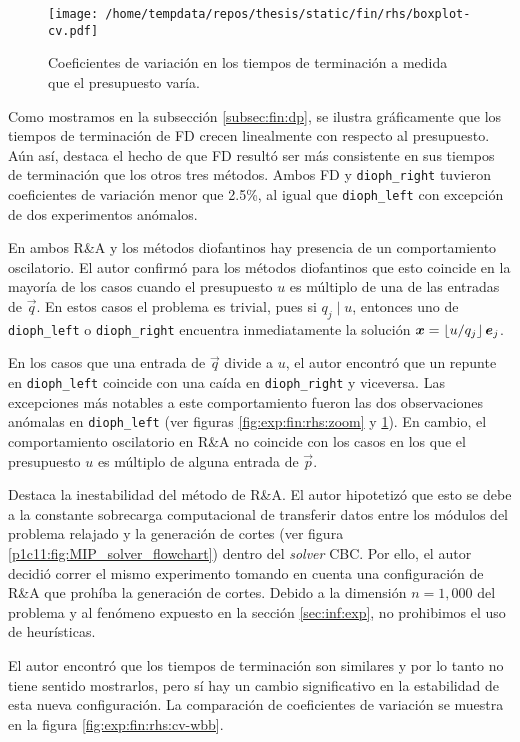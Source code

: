 \begin{figure}[hbtp]
	\centering
	\texttt{[image: /home/tempdata/repos/thesis/static/fin/rhs/boxplot-cv.pdf]}
	\caption{Coeficientes de variación en los tiempos de terminación a medida que el presupuesto
	varía.}
	\label{fig:exp:fin:rhs:cv}
\end{figure}

Como mostramos en la subsección \ref{subsec:fin:dp}, se ilustra gráficamente que los tiempos de
terminación de FD crecen linealmente con respecto al presupuesto. Aún así, destaca el hecho de que
FD resultó ser más consistente en sus tiempos de terminación que los otros tres métodos. Ambos FD y
\texttt{dioph\_right} tuvieron coeficientes de variación menor que 2.5\%, al igual que
\texttt{dioph\_left} con excepción de dos experimentos anómalos.

En ambos R\&A y los métodos diofantinos hay presencia de un comportamiento oscilatorio. El autor
confirmó para los métodos diofantinos que esto coincide en la mayoría de los casos cuando el
presupuesto $u$ es múltiplo de una de las entradas de $\vec{q}$. En estos casos el problema es
trivial, pues si $q_j \mid u$, entonces uno de \texttt{dioph\_left} o \texttt{dioph\_right}
encuentra inmediatamente la solución $\boldsymbol{x} = \left\lfloor u/q_j \right\rfloor\boldsymbol{e}_j$.

En los casos que una entrada de $\vec{q}$ divide a $u$, el autor encontró que un repunte en
\texttt{dioph\_left} coincide con una caída en \texttt{dioph\_right} y viceversa. Las excepciones
más notables a este comportamiento fueron las dos observaciones anómalas en \texttt{dioph\_left}
(ver figuras \ref{fig:exp:fin:rhs:zoom} y \ref{fig:exp:fin:rhs:cv}). En cambio, el comportamiento
oscilatorio en R\&A no coincide con los casos en los que el presupuesto $u$ es múltiplo de alguna
entrada de $\vec{p}$.

Destaca la inestabilidad del método de R\&A. El autor hipotetizó que esto se debe a la constante
sobrecarga computacional de transferir datos entre los módulos del problema relajado y la generación
de cortes (ver figura \ref{p1c11:fig:MIP_solver_flowchart}) dentro del \textit{solver} CBC. Por
ello, el autor decidió correr el mismo experimento tomando en cuenta una configuración de R\&A que
prohíba la generación de cortes. Debido a la dimensión $n = 1{,}000$ del problema y al fenómeno
expuesto en la sección \ref{sec:inf:exp}, no prohibimos el uso de heurísticas.

El autor encontró que los tiempos de terminación son similares y por lo tanto no tiene sentido
mostrarlos, pero sí hay un cambio significativo en la estabilidad de esta nueva configuración. La
comparación de coeficientes de variación se muestra en la figura \ref{fig:exp:fin:rhs:cv-wbb}.

